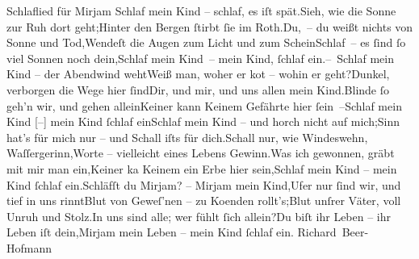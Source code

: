 \begin{ledgroupsized}[t]{13cm}
        \addtolength\longestz{1em}
        \addtolength\longestd{1em}
      \pstart\noindent{}
                  \pend\pstart\noindent{}
                  \pend\pstart\noindent{}
                  \pend{\bigskip}\pstart
           \noindent{}{\pb}Schlaflied für Mirjam\pend
           {\bigskip}\stanza{}Schlaf mein Kind – schlaf, es iſt spät.\newverse{}Sieh, wie die Sonne zur Ruh dort geht;\newverse{}Hinter den Bergen ſtirbt ſie im Roth.\newverse{}Du, – du weißt nichts von Sonne und Tod,\newverse{}Wendeſt die Augen zum Licht und zum Schein\newverse{}Schlaf – es ſind ſo viel Sonnen noch dein,\newverse{}Schlaf mein Kind – mein Kind, ſchlaf ein.\stanzaend{}\stanza{}– Schlaf mein Kind – der Abendwind weht\newverse{}Weiß man, woher er ko{\geminationm}t – wohin er geht?\newverse{}Dunkel, verborgen die Wege hier ſind\newverse{}Dir, und mir, und uns allen mein Kind.\newverse{}Blinde ſo geh’n wir, und gehen allein\newverse{}Keiner kann Keinem Gefährte hier ſein –\newverse{}Schlaf mein Kind {[}–{]} mein Kind ſchlaf ein\stanzaend{}\stanza{}{\pb}Schlaf mein Kind – und horch
                     nicht auf mich;\newverse{}Sinn hat’s für mich nur – und Schall iſts für dich.\newverse{}Schall nur, wie Windeswehn, Waſſergerinn,\newverse{}Worte – vielleicht eines Lebens Gewinn.\newverse{}Was ich gewonnen, gräbt mit mir man ein,\newverse{}Keiner ka{\geminationn} Keinem ein Erbe hier sein,\newverse{}Schlaf mein Kind – mein Kind ſchlaf ein.\stanzaend{}\stanza{}Schläfſt du Mirjam? – Mirjam mein Kind,\newverse{}Ufer nur ſind wir, und tief in uns rinnt\newverse{}Blut von Geweſ’nen – zu Ko{\geminationm}enden rollt’s;\newverse{}Blut unſrer Väter, voll Unruh und Stolz.\newverse{}In uns sind alle; wer fühlt ſich allein?\newverse{}Du biſt ihr Leben – ihr Leben iſt dein,\newverse{}Mirjam mein Leben – mein Kind ſchlaf
                     ein.\stanzaend{}\pstart
           \spacefill\mbox{Richard Beer-Hofmann}\pend
           
         
         \endnumbering{}\end{ledgroupsized}  \newcommand{\dateiname}{L00806}\newcommand{\titel}{Arthur Schnitzler an Richard Beer-Hofmann, 17. 6. 1898}\newcommand{\editorInnen}{Martin Anton Müller und Gerd-Hermann Susen}
      